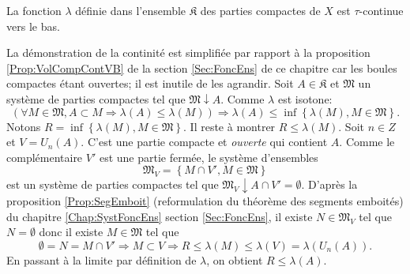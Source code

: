 \begin{propn}\label{Prop:PromContVB}
 La fonction $\lambda$ définie dans l'ensemble $\mathfrak{K}$ des parties compactes de $X$ est $\tau$-continue vers le bas.
\end{propn}
\begin{demo}
La démonstration de la continité est simplifiée par rapport à la proposition \ref{Prop:VolCompContVB} de la section \ref{Sec:FoncEns} de ce chapitre car les boules compactes étant ouvertes; il est inutile de les agrandir.\newline
 Soit $A \in \mathfrak{K}$ et $\mathfrak{M}$ un système de parties compactes tel que $\mathfrak{M}\downarrow A$. Comme $\lambda$ est isotone:
\begin{displaymath}
 \left( \forall M \in \mathfrak{M}, A \subset M \Rightarrow \lambda(A) \leq \lambda(M) \right) \Rightarrow \lambda(A) \leq \inf\left\lbrace \lambda(M), M \in \mathfrak{M}\right\rbrace.
\end{displaymath}
Notons $R = \inf\left\lbrace \lambda(M), M \in \mathfrak{M}\right\rbrace$. Il reste à montrer $R \leq \lambda(M)$.\newline
Soit $n\in Z$ et $V = U_n(A)$. C'est une partie compacte et \emph{ouverte} qui contient $A$. Comme le complémentaire $V'$ est une partie fermée, le système d'ensembles
\begin{displaymath}
 \mathfrak{M}_V = \left\lbrace M \cap V' , M \in \mathfrak{M}\right\rbrace
\end{displaymath}
est un système de parties compactes tel que $\mathfrak{M}_V \downarrow A \cap V' = \emptyset$. D'après la proposition \ref{Prop:SegEmboit} (reformulation du théorème des segments emboités)
du chapitre \ref{Chap:SystFoncEns} section \ref{Sec:FoncEns}, il existe $N \in \mathfrak{M}_V$ tel que $N=\emptyset$ donc il existe $M \in \mathfrak{M}$ tel que
\begin{displaymath}
 \emptyset = N = M \cap V' \Rightarrow M \subset V \Rightarrow R \leq \lambda(M) \leq \lambda(V) = \lambda(U_n(A)).
\end{displaymath}
En passant à la limite par définition de $\lambda$, on obtient $R \leq \lambda(A)$.
\end{demo}

